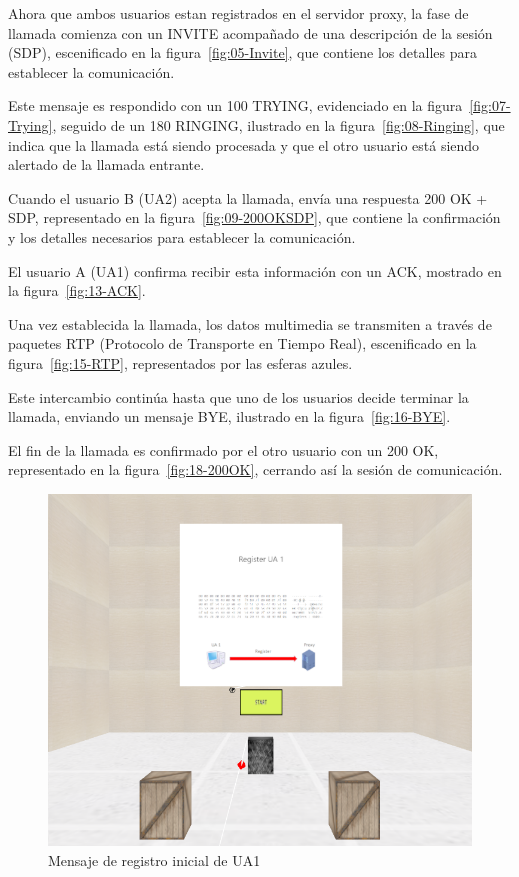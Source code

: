 \documentclass[a4paper, 12pt]{book}
\begin{document}
\bigskip


Ahora que ambos usuarios estan registrados en el servidor proxy, la fase de llamada comienza con un INVITE acompañado de 
una descripción de la sesión (SDP), escenificado en la figura~\ref{fig:05-Invite}, 
que contiene los detalles para establecer la comunicación. 

\bigskip

Este mensaje es respondido con un 100 TRYING, evidenciado en la figura~\ref{fig:07-Trying},
seguido de un 180 RINGING, ilustrado en la figura~\ref{fig:08-Ringing}, 
que indica que la llamada está siendo procesada y que el otro usuario está siendo alertado de la llamada entrante. 

\bigskip

Cuando el usuario B (UA2) acepta la llamada, envía una respuesta 200 OK + SDP, representado en la figura~\ref{fig:09-200OKSDP}, 
que contiene la confirmación y los detalles necesarios para establecer la comunicación. 

\bigskip

El usuario A (UA1) confirma recibir esta información con un ACK, mostrado en la figura~\ref{fig:13-ACK}.

\bigskip

Una vez establecida la llamada, los datos multimedia se transmiten a través de 
paquetes RTP (Protocolo de Transporte en Tiempo Real), escenificado en la figura~\ref{fig:15-RTP}, 
representados por las esferas azules. 

\bigskip

Este intercambio continúa hasta que uno de los usuarios decide terminar la llamada, 
enviando un mensaje BYE, ilustrado en la figura~\ref{fig:16-BYE}. 

\bigskip

El fin de la llamada es confirmado por el otro usuario con un 200 OK, representado en la figura~\ref{fig:18-200OK}, 
cerrando así la sesión de comunicación.

\begin{figure}
  \centering
  \includegraphics[width=12cm, keepaspectratio]{img/resultados/01-Register_UA1.png}
  \caption{Mensaje de registro inicial de UA1}
  \label{fig:01-Register_UA1}
\end{figure}
\end{document}
